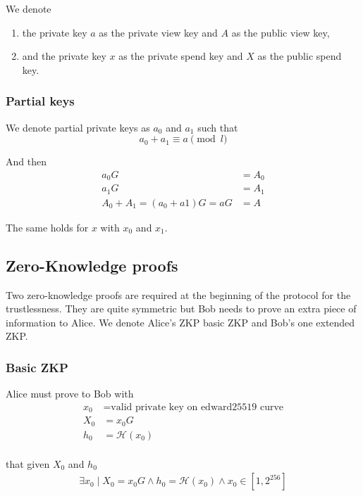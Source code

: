 \documentclass{llncs}
\begin{document}
We denote
\begin{enumerate}[label=(\roman*)]
\item the private key $a$ as the private view key and $A$ as the public view key,
\item and the private key $x$ as the private spend key and $X$ as the public spend key.
\end{enumerate}

\subsubsection{Partial keys}
We denote partial private keys as $a_0$ and $a_1$ such that
$$a_0 + a_1 \equiv a \pmod l$$

And then
\begin{equation}
\begin{split}
    a_0G &= A_0 \\
    a_1G &= A_1 \\
    A_0 + A_1 = (a_0 + a1)G = aG &= A
\end{split}
\end{equation}

The same holds for $x$ with $x_0$ and $x_1$.

\subsection{Zero-Knowledge proofs}
Two zero-knowledge proofs are required at the beginning of the protocol for the trustlessness. They are quite symmetric but Bob needs to prove an extra piece of information to Alice. We denote Alice's ZKP basic ZKP and Bob's one extended ZKP.

\subsubsection{Basic ZKP}
Alice must prove to Bob with
\begin{equation}
\begin{split}
    x_0 &= \text{valid private key on edward25519 curve} \\
    X_0 &= x_0G \\
    h_0 &= \mathcal{H}(x_0) \\
\end{split}
\end{equation}

that given $X_0$ and $h_0$
\begin{equation}
\begin{split}
    \exists x_0 \mid X_0 = x_0G \land h_0 = \mathcal{H}(x_0) \land x_0 \in [1, 2^{256}]
\end{split}
\end{equation}
\end{document}
